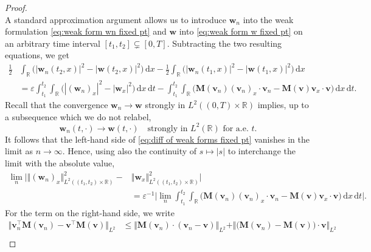 \documentclass[11pt,a4paper,reqno]{amsart}
\numberwithin{equation}{section}
\theoremstyle{definition}
\theoremstyle{remark}
\newcommand{\bv}{\mathbf{v}}
\newcommand{\bw}{\mathbf{w}}
\renewcommand{\d}{\, \mathrm{d}}
\newcommand{\bM}{\mathbf{M}}
\renewcommand{\leq}{\leqslant}
\begin{document}
{\begin{proof}
\begin{equation}
\end{equation}
A standard approximation argument allows us to introduce $\bw_n$ into the weak formulation \eqref{eq:weak form wn fixed pt} and $\bw$ into \eqref{eq:weak form w fixed pt} on an arbitrary time interval $[t_1,t_2] \subsetneq [0,T]$. Subtracting the two resulting equations, we get 
\begin{equation}\label{eq:diff of weak forms fixed pt}
   \begin{aligned} \frac{1}{2}&\int_\mathbb{R} \big( |\bw_n(t_2,x)|^2 -  |\bw(t_2,x)|^2 \big) \d x - \frac{1}{2}\int_\mathbb{R} \big(|\bw_n(t_1,x)|^2 - |\bw(t_1,x)|^2 \big) \d x \\ 
   &= \varepsilon \int_{t_1}^{t_2} \int_\mathbb{R} \big( |(\bw_n)_x|^2 - |\bw_x|^2 \big) \d x \d t -\int_{t_1}^{t_2}\int_\mathbb{R} \Big( \bM(\bv_n) (\bv_n)_x \cdot \bv_n - \bM(\bv) \bv_x \! \cdot \! \bv \Big) \d x \d t. 
   \end{aligned}
\end{equation}
Recall that the convergence $\bw_n \to \bw$ strongly in $L^2((0,T)\times\mathbb{R})$ implies, up to a subsequence which we do not relabel, 
\begin{equation*}
    \bw_n(t,\cdot) \to \bw(t,\cdot) \quad \text{strongly in } L^2(\mathbb{R}) \text{ for a.e.~}t. 
\end{equation*}
It follows that the left-hand side of \eqref{eq:diff of weak forms fixed pt} vanishes in the limit as $n\to\infty$. Hence, using also the continuity of $s \mapsto |s|$ to interchange the limit with the absolute value, 
\begin{equation}\label{eq:diff of weak forms fixed pt checkpoint}
      \begin{aligned} \lim_n \Big| \Vert (\bw_n )_x \Vert^2_{L^2((t_1,t_2)\times\mathbb{R})} -&  \Vert \bw_x \Vert^2_{L^2((t_1,t_2)\times\mathbb{R})}\Big| \\ 
      &= \varepsilon^{-1} \bigg|\lim_n \int_{t_1}^{t_2}\int_\mathbb{R} \Big( \bM(\bv_n) (\bv_n)_x \cdot \bv_n - \bM(\bv) \bv_x \cdot \bv \Big) \d x \d t\bigg|. 
   \end{aligned}
\end{equation}
For the term on the right-hand side, we write
\begin{equation}\label{eq:using dct to conclude fixed pt cpctness}
    \begin{aligned}
      \Vert \bv_n^\intercal \bM(\bv_n) - \bv^\intercal \bM(\bv) \Vert_{L^2} &\leq \Vert \bM(\bv_n) \cdot (\bv_n - \bv) \Vert_{L^2} + \Vert \big( \bM(\bv_n) - \bM(\bv) \big) \cdot \bv \Vert_{L^2} \\ 

\end{aligned}
\end{equation}
\end{proof}}
\end{document}
